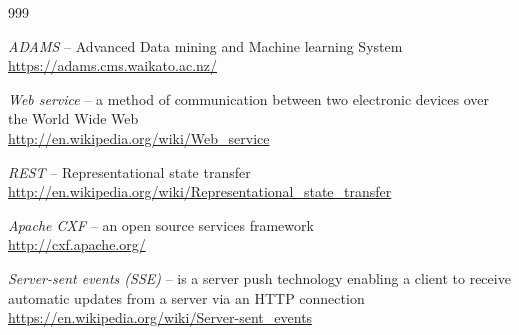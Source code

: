 
\begin{thebibliography}{999}

		\textit{ADAMS} -- Advanced Data mining and Machine learning System \\
		{\scriptsize \url{https://adams.cms.waikato.ac.nz/}{}}
		
		\textit{Web service} -- a method of communication between two electronic 
		devices over the World Wide Web \\
		{\scriptsize \url{http://en.wikipedia.org/wiki/Web_service}{}}
		
		\textit{REST} -- Representational state transfer \\
		{\scriptsize \url{http://en.wikipedia.org/wiki/Representational_state_transfer}{}}

		\textit{Apache CXF} -- an open source services framework \\
		{\scriptsize \url{http://cxf.apache.org/}{}}

		\textit{Server-sent events (SSE)} -- is a server push technology enabling a client to receive automatic updates
		from a server via an HTTP connection \\
		{\scriptsize \url{https://en.wikipedia.org/wiki/Server-sent_events}{}}

\end{thebibliography}
